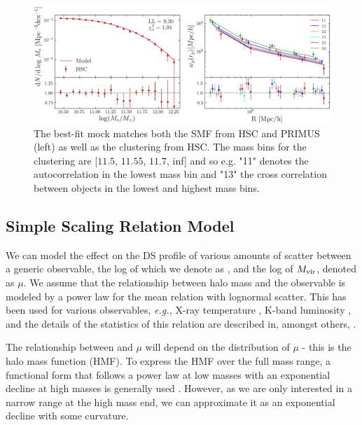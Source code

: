 \documentclass[a4paper,fleqn,usenatbib]{mnras}
\begin{document}
\begin{figure}
  \centering
  \includegraphics[width=\textwidth]{figure/mock_placeholder}
  \caption{ The best-fit mock matches both the SMF from HSC and PRIMUS (left) as well as the clustering from HSC. The mass bins for the clustering are [$11.5$, $11.55$, $11.7$, inf] and so e.g. "11" denotes the autocorrelation in the lowest mass bin and "13" the cross correlation between objects in the lowest and highest mass bins.}
  \label{fig:best_mock}
\end{figure}


\subsection{Simple Scaling Relation Model}

We can model the effect on the DS profile of various amounts of scatter between a generic observable, the log of which we denote as \obsSym{}, and the log of $M_{\rm vir}$, denoted as $\mu$.
We assume that the relationship between halo mass and the observable is modeled by a power law for the mean relation with lognormal scatter. This has been used for various observables, {\it e.g.,\/} X-ray temperature \citet{Lieu2016}, K-band luminosity \citet{Ziparo2016}, and the details of the statistics of this relation are described in, amongst others, \citet{Evrard2014, Farahi2018}.

The relationship between \obsSym{} and $\mu$ will depend on the distribution of $\mu$ - this is the halo mass function (HMF). To express the HMF over the full mass range, a functional form that follows a power law at low masses with an exponential decline at high masses is generally used \citep[\eg{}][]{Tinker2008}. However, as we are only interested in a narrow range at the high mass end, we can approximate it as an exponential decline with some curvature.
\end{document}
